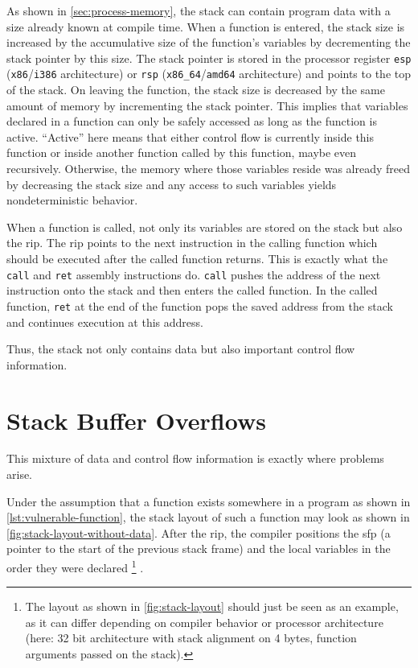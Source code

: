 As shown in \cref{sec:process-memory}, the stack can contain program data with a size already known at compile time.
When a function is entered, the stack size is increased by the accumulative size of the function's variables by decrementing the stack pointer by this size.
The stack pointer is stored in the processor register \texttt{esp} (\texttt{x86}/\texttt{i386} architecture) or \texttt{rsp} (\texttt{x86\_64}/\texttt{amd64} architecture) and points to the top of the stack.
On leaving the function, the stack size is decreased by the same amount of memory by incrementing the stack pointer.
This implies that variables declared in a function can only be safely accessed as long as the function is active.
``Active'' here means that either control flow is currently inside this function or inside another function called by this function, maybe even recursively.
Otherwise, the memory where those variables reside was already freed by decreasing the stack size and any access to such variables yields nondeterministic behavior.

When a function is called, not only its variables are stored on the stack but also the \gls{rip}.
The \gls{rip} points to the next instruction in the calling function which should be executed after the called function returns.
This is exactly what the \texttt{call} and \texttt{ret} assembly instructions do.
\texttt{call} pushes the address of the next instruction onto the stack and then enters the called function.
In the called function, \texttt{ret} at the end of the function pops the saved address from the stack and continues execution at this address.

Thus, the stack not only contains data but also important control flow information.

\section{Stack Buffer Overflows}
\label{sec:stack-buffer-overflows}

This mixture of data and control flow information is exactly where problems arise.

Under the assumption that a function exists somewhere in a program as shown in \cref{lst:vulnerable-function}, the stack layout of such a function may look as shown in \cref{fig:stack-layout-without-data}.
After the \gls{rip}, the compiler positions the \gls{sfp} (a pointer to the start of the previous stack frame) and the local variables in the order they were declared%
	\footnote{
		The layout as shown in \cref{fig:stack-layout} should just be seen as an example, as it can differ depending on compiler behavior or processor architecture (here: 32 bit architecture with stack alignment on 4 bytes, function arguments passed on the stack).
	}%
.

